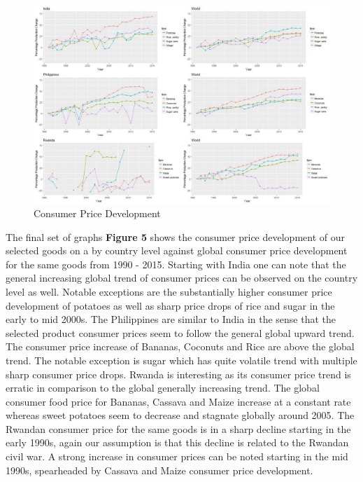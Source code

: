 \documentclass[11pt]{article}
\begin{document}
\FloatBarrier
\begin{figure}
\begin{center}
\includegraphics[scale=0.65]{production.jpg}
\caption{Consumer Price Development}
\label{figure5}
\end{center}
\end{figure}
\FloatBarrier

The final set of graphs \textbf{Figure 5} shows the consumer price development of our selected goods on a by country level against global consumer price development for the same goods from 1990 - 2015. Starting with India one can note that the general increasing global trend of consumer prices can be observed on the country level as well. Notable exceptions are the substantially higher consumer price development of potatoes as well as sharp price drops of rice and sugar in the early to mid 2000s. 
The Philippines are similar to India in the sense that the selected product consumer prices seem to follow the general global upward trend. The consumer price increase of Bananas, Coconuts and Rice are above the global trend. The notable exception is sugar which has quite volatile trend with multiple sharp consumer price drops. 
Rwanda is interesting as its consumer price trend is erratic in comparison to the global generally increasing trend. The global consumer food price for Bananas, Cassava and Maize increase at a constant rate whereas sweet potatoes seem to decrease and stagnate globally around 2005. The Rwandan consumer price for the same goods is in a sharp decline starting in the early 1990s, again our assumption is that this decline is related to the Rwandan civil war. A strong increase in consumer prices can be noted starting in the mid 1990s, spearheaded by Cassava and Maize consumer price development. 
\end{document}

